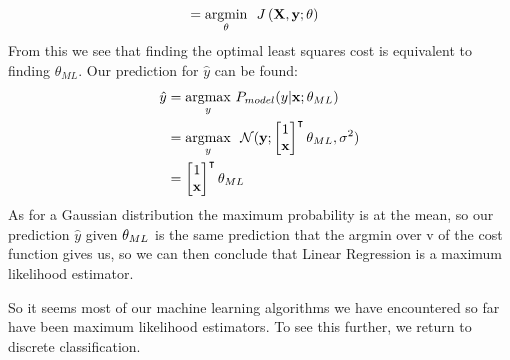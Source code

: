 \begin{example}
\begin{align*}
        &= \underset{\vtheta}{\argmin}\ \ J\left(\MX,\vy;\vtheta \right)
    \end{align*}
    From this we see that finding the optimal least squares cost is equivalent to finding $\theta_{ML}$. Our prediction for $\hat{y}$ can be found: 
    \begin{align*}
        \hat{y} &= \underset{y}{\argmax}\ P_{model}(y|\vx;\vtheta_{ML})\\
        &= \underset{y}{\argmax} \ \ \Normal(\vy;\begin{bmatrix} 1 \\ \vx \end{bmatrix}^\intercal\vtheta_{ML},\sigma^2) \\
        &= \begin{bmatrix} 1 \\ \vx \end{bmatrix}^\intercal\vtheta_{ML}
    \end{align*}
    As for a Gaussian distribution the maximum probability is at the mean, so our prediction $\hat{y}$ given $\vtheta_{ML}$ is the same prediction that the argmin over v of the cost function gives us, so we can then conclude that Linear Regression is a maximum likelihood estimator. 
\end{example}
So it seems most of our machine learning algorithms we have encountered so far have been maximum likelihood estimators. To see this further, we return to discrete classification. \\
